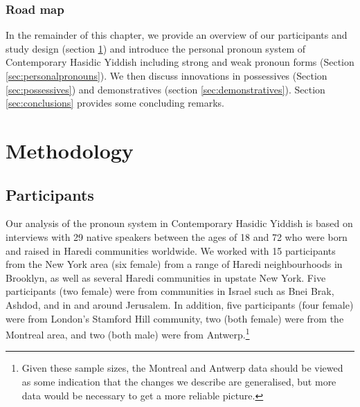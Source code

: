 \documentclass[output=paper, hidelinks]{langscibook}
\begin{document}
\subsubsection{Road map}

In the remainder of this chapter, we provide an overview of our participants and study design (section \ref{sec:methods}) and introduce the personal pronoun system of Contemporary Hasidic Yiddish including strong and weak pronoun forms (Section \ref{sec:personalpronouns}). We then discuss innovations in possessives (Section \ref{sec:possessives}) and demonstratives (section \ref{sec:demonstratives}). Section \ref{sec:conclusions} provides some concluding remarks.


\section{Methodology}\label{sec:methods}

\subsection{Participants}

Our analysis of the pronoun system in Contemporary Hasidic Yiddish is based on interviews with 29 
native speakers between the ages of 18 and 72 who were born and raised in Haredi communities worldwide. We worked with 15 participants from the New York area (six female) from a range of Haredi neighbourhoods in Brooklyn, as well as several Haredi communities in upstate New York. Five participants (two female) were from communities in Israel such as Bnei Brak, Ashdod, and in and around Jerusalem. In addition, five participants (four female) were from London's Stamford Hill community, two (both female) were from the Montreal area, and two (both male) were from Antwerp.\footnote{Given these sample sizes, the Montreal and Antwerp data should be viewed as some indication that the changes we describe are generalised, but more data would be necessary to get a more reliable picture.} 
\end{document}

